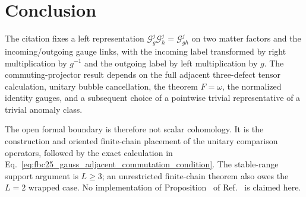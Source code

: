\documentclass{article}
\begin{document}
\section{Conclusion}

The citation fixes a left representation
$\mathcal G^j_g\mathcal G^j_h=\mathcal G^j_{gh}$ on two matter factors and
the incoming/outgoing gauge links, with the incoming label transformed by
right multiplication by $g^{-1}$ and the outgoing label by left multiplication
by $g$.  The commuting-projector result depends on the full adjacent
three-defect tensor calculation, unitary bubble cancellation, the theorem
$F=\omega$, the normalized identity gauges, and a subsequent choice of a
pointwise trivial representative of a trivial anomaly class.

The open formal boundary is therefore not scalar cohomology.  It is the
construction and oriented finite-chain placement of the unitary comparison
operators, followed by the exact calculation in
Eq.~\ref{eq:fbc25_gauss_adjacent_commutation_condition}.  The stable-range
support argument is $L\geq3$; an unrestricted finite-chain theorem also owes
the $L=2$ wrapped case.  No implementation of
Proposition~ of
Ref.~\cite[lines~3602--3655]{FrancoRubio2025MPUGauging} is claimed here.



\end{document}
